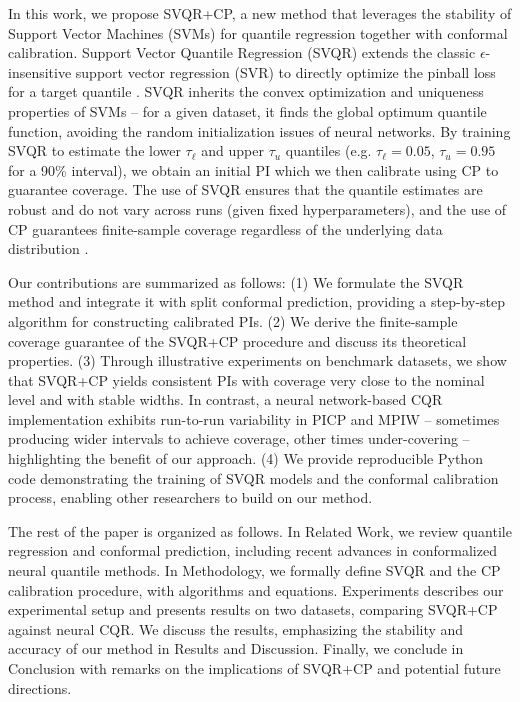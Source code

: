 \documentclass{article}
\begin{document}
In this work, we propose SVQR+CP, a new method that leverages the stability of Support Vector Machines (SVMs) for quantile regression together with conformal calibration. Support Vector Quantile Regression (SVQR) extends the classic $\epsilon$-insensitive support vector regression (SVR) to directly optimize the pinball loss for a target quantile \citep{Takeuchi2006NonparametricQE}. SVQR inherits the convex optimization and uniqueness properties of SVMs -- for a given dataset, it finds the global optimum quantile function, avoiding the random initialization issues of neural networks. By training SVQR to estimate the lower $\tau_{\ell}$ and upper $\tau_{u}$ quantiles (e.g. $\tau_{\ell}=0.05$, $\tau_{u}=0.95$ for a 90\% interval), we obtain an initial PI which we then calibrate using CP to guarantee coverage. The use of SVQR ensures that the quantile estimates are robust and do not vary across runs (given fixed hyperparameters), and the use of CP guarantees finite-sample coverage regardless of the underlying data distribution \citep{Shafer2008TutorialOC}.

Our contributions are summarized as follows: (1) We formulate the SVQR method and integrate it with split conformal prediction, providing a step-by-step algorithm for constructing calibrated PIs. (2) We derive the finite-sample coverage guarantee of the SVQR+CP procedure and discuss its theoretical properties. (3) Through illustrative experiments on benchmark datasets, we show that SVQR+CP yields consistent PIs with coverage very close to the nominal level and with stable widths. In contrast, a neural network-based CQR implementation exhibits run-to-run variability in PICP and MPIW -- sometimes producing wider intervals to achieve coverage, other times under-covering -- highlighting the benefit of our approach. (4) We provide reproducible Python code demonstrating the training of SVQR models and the conformal calibration process, enabling other researchers to build on our method.

The rest of the paper is organized as follows. In Related Work, we review quantile regression and conformal prediction, including recent advances in conformalized neural quantile methods. In Methodology, we formally define SVQR and the CP calibration procedure, with algorithms and equations. Experiments describes our experimental setup and presents results on two datasets, comparing SVQR+CP against neural CQR. We discuss the results, emphasizing the stability and accuracy of our method in Results and Discussion. Finally, we conclude in Conclusion with remarks on the implications of SVQR+CP and potential future directions.
\end{document}
